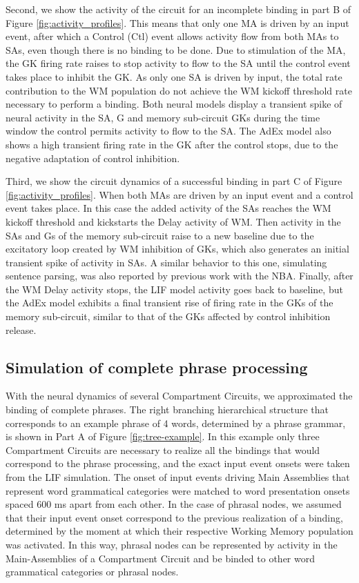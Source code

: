 \documentclass[10pt]{article}
\begin{document}
Second, we show the activity of the circuit for an incomplete binding in part B of Figure \ref{fig:activity_profiles}.
This means that only one MA is driven by an input event, after which a Control (Ctl) event allows activity flow from both MAs to SAs, even though there is no binding to be done.
Due to stimulation of the MA, the GK firing rate raises to stop activity to flow to the SA until the control event takes place to inhibit the GK.
As only one SA is driven by input, the total rate contribution to the WM population do not achieve the WM kickoff threshold rate necessary to perform a binding.
Both neural models display a transient spike of neural activity in the SA, G and memory sub-circuit GKs during the time window the control permits activity to flow to the SA.
The AdEx model also shows a high transient firing rate in the GK after the control stops, due to the negative adaptation of control inhibition.

Third, we show the circuit dynamics of a successful binding in part C of Figure \ref{fig:activity_profiles}.
When both MAs are driven by an input event and a control event takes place.
In this case the added activity of the SAs reaches the WM kickoff threshold and kickstarts the Delay activity of WM.
Then activity in the SAs and Gs of the memory sub-circuit raise to a new baseline due to the excitatory loop created by WM inhibition of GKs, which also generates an initial transient spike of activity in SAs.
A similar behavior to this one, simulating sentence parsing, was also reported by previous work with the NBA\cite{Frank_2014}.
Finally, after the WM Delay activity stops, the LIF model activity goes back to baseline, but the AdEx model exhibits a final transient rise of firing rate in the GKs of the memory sub-circuit, similar to that of the GKs affected by control inhibition release.


\subsection{Simulation of complete phrase processing}
{\label{44kfmvjkc32}}


With the neural dynamics of several Compartment Circuits, we approximated the binding of complete phrases.
The right branching hierarchical structure that corresponds to an example phrase of 4 words, determined by a phrase grammar, is shown in Part A of Figure \ref{fig:tree-example}.
In this example only three Compartment Circuits are necessary to realize all the bindings that would correspond to the phrase processing, and the exact input event onsets were taken from the LIF simulation.
The onset of input events driving Main Assemblies that represent word grammatical categories were matched to word presentation onsets spaced 600 ms apart from each other.
In the case of phrasal nodes, we assumed that their input event onset correspond to the previous realization of a binding, determined by the moment at which their respective Working Memory population was activated.
In this way, phrasal nodes can be represented by activity in the Main-Assemblies of a Compartment Circuit and be binded to other word grammatical categories or phrasal nodes.
\end{document}
